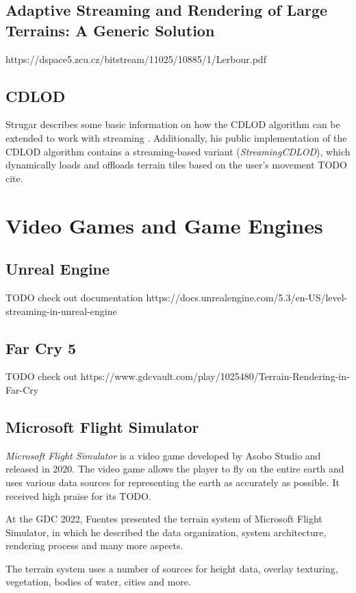 \subsection{Adaptive Streaming and Rendering of Large Terrains:
A Generic Solution}
https://dspace5.zcu.cz/bitstream/11025/10885/1/Lerbour.pdf

\subsection{CDLOD}
Strugar describes some basic information on how the CDLOD algorithm can be extended to
work with streaming \cite{cdlod}.
Additionally, his public implementation of the CDLOD algorithm contains 
a streaming-based variant (\textit{StreamingCDLOD}), which dynamically loads and offloads 
terrain tiles based on the user's movement TODO cite.

\section{Video Games and Game Engines}
\subsection{Unreal Engine}
TODO check out documentation 
https://docs.unrealengine.com/5.3/en-US/level-streaming-in-unreal-engine

\subsection{Far Cry 5}
TODO check out 
https://www.gdcvault.com/play/1025480/Terrain-Rendering-in-Far-Cry

\subsection{Microsoft Flight Simulator}
\textit{Microsoft Flight Simulator} is a video game developed by Asobo Studio and released in 2020.
The video game allows the player to fly on the entire earth and uses various 
data sources for representing the earth as accurately as possible.
It received high praise for its TODO.

At the GDC 2022, Fuentes presented the terrain system of Microsoft Flight Simulator,
in which he described the data organization, system architecture, rendering process and many more aspects.

The terrain system uses a number of sources for height data, overlay texturing, vegetation, bodies of water, cities
and more.

